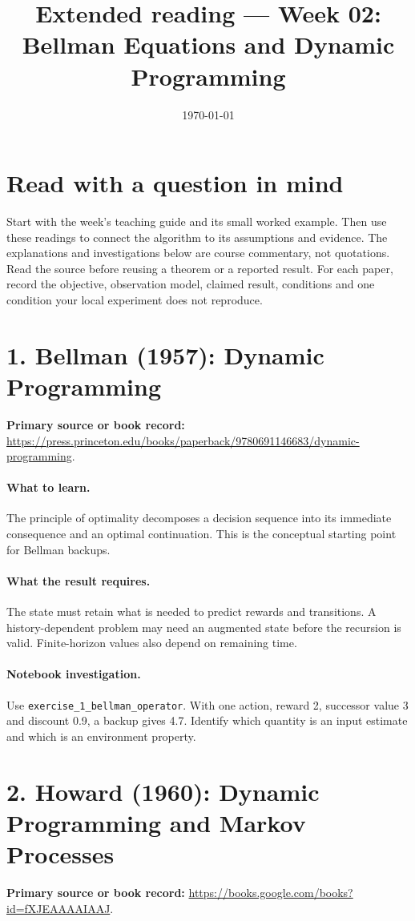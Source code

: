 \documentclass[11pt]{scrartcl}
\title{Extended reading --- Week 02: Bellman Equations and Dynamic Programming}
\date{\today}
\begin{document}
\maketitle
\section*{Read with a question in mind}
Start with the week's teaching guide and its small worked example. Then use
these readings to connect the algorithm to its assumptions and evidence.
The explanations and investigations below are course commentary, not
quotations. Read the source before reusing a theorem or a reported result.
For each paper, record the objective, observation model, claimed result,
conditions and one condition your local experiment does not reproduce.

\section*{1. Bellman (1957): Dynamic Programming}
\textbf{Primary source or book record:} \url{https://press.princeton.edu/books/paperback/9780691146683/dynamic-programming}.

\paragraph{What to learn.} The principle of optimality decomposes a decision sequence into its immediate consequence and an optimal continuation. This is the conceptual starting point for Bellman backups.

\paragraph{What the result requires.} The state must retain what is needed to predict rewards and transitions. A history-dependent problem may need an augmented state before the recursion is valid. Finite-horizon values also depend on remaining time.

\paragraph{Notebook investigation.} Use \texttt{exercise\_1\_bellman\_operator}. With one action, reward 2, successor value 3 and discount 0.9, a backup gives 4.7. Identify which quantity is an input estimate and which is an environment property.

\section*{2. Howard (1960): Dynamic Programming and Markov Processes}
\textbf{Primary source or book record:} \url{https://books.google.com/books?id=fXJEAAAAIAAJ}.
\end{document}
